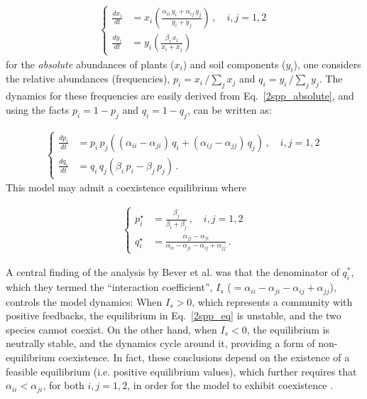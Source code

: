 \documentclass[11pt]{article}
\begin{document}
\begin{align} \label{2spp_absolute}
	\begin{cases}
	\frac{dx_i}{dt} &= x_i \left( \frac{\alpha_{ii} \, y_i + \alpha_{ij} \, y_j}{y_i + y_j} \right) \, , \quad  i, j = 1,2 \\
	\frac{dy_i}{dt} &= y_i \left( \frac{\beta_i \, x_i}{x_i + x_j} \right)
	\end{cases}
\end{align}
for the \emph{absolute} abundances of plants ($x_i$) and soil components ($y_i$), one considers the relative abundances (frequencies), $p_i = x_i \, / \sum_j x_j$ and $q_i = y_i \, / \sum_{j} y_j$. The dynamics for these frequencies are easily derived from Eq.~\ref{2spp_absolute}, and using the facts $p_i = 1 - p_j$ and $q_i = 1 - q_j$, can be written as:

\begin{align} \label{2spp_relative}
\begin{cases}
\frac{dp_i}{dt} &= p_i \, p_j \left( (\alpha_{ii} - \alpha_{ji}) \, q_i + (\alpha_{ij} - \alpha_{jj}) \, q_j \right) \, , \quad  i, j = 1,2 \\
\frac{dq_i}{dt} &= q_i \, q_j (\beta_i \, p_i - \beta_j \, p_j) \, .
\end{cases}
\end{align}
This model may admit a coexistence equilibrium where

\begin{align} \label{2spp_eq}
\begin{cases}
p_i^\star &= \frac{\beta_j}{\beta_i + \beta_j} \, , \quad  i, j = 1,2 \\
q_i^\star &= \frac{\alpha_{jj} - \alpha_{ji}}{\alpha_{ii} - \alpha_{ji} - \alpha_{ij} + \alpha_{jj}} \, .
\end{cases}
\end{align}

A central finding of the analysis by Bever et al. was that the denominator of $q_i^*$, which they termed the ``interaction coefficient'', $I_s$ ($= \alpha_{ii} - \alpha_{ji} - \alpha_{ij} + \alpha_{jj}$), controls the model dynamics: When $I_s > 0$, which represents a community with positive feedbacks, the equilibrium in Eq.~\ref{2spp_eq} is unstable, and the two species cannot coexist. On the other hand, when $I_s < 0$, the equilibrium is neutrally stable, and the dynamics cycle around it, providing a form of non-equilibrium coexistence. In fact, these conclusions depend on the existence of a feasible equilibrium (i.e. positive equilibrium values), which further requires that $\alpha_{ii} < \alpha_{ji}$, for both $i, j = 1, 2$, in order for the model to exhibit coexistence \citep{bever1997incorporating,ke2015incorporating}. 
\end{document}
